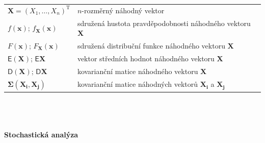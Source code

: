 \documentclass[a4paper,12pt]{report}
\theoremstyle{definition} \newtheorem{definice}[veta]{Definice}
\theoremstyle{remark}
\begin{document}
   \begin{tabular}{p{4cm} p{9.3cm}}
  $\boldsymbol{X}=(X_1,\dots,X_n)^\mathrm{T}$                 &     $n$-rozměrný náhodný vektor \\
  $f(\mathbf{x})$; $f_{\boldsymbol{X}}(\mathbf{x})$                                             &   sdružená hustota pravděpodobnosti náhodného vektoru  $\boldsymbol{X}$\\
   $F(\mathbf{x})$; $F_{\boldsymbol{X}}(\mathbf{x})$                                             &   sdružená distribuční funkce náhodného vektoru  $\boldsymbol{X}$\\
    $\mathsf{E}(\boldsymbol{X})$; $\mathsf{E}\boldsymbol{X}$                             &   vektor středních hodnot náhodného vektoru $\boldsymbol{X}$\\
   $\mathsf{D}(\boldsymbol{X})$; $\mathsf{D}\boldsymbol{X}$                             &   kovarianční matice náhodného vektoru $\boldsymbol{X}$\\
    $\boldsymbol{\Sigma}(\boldsymbol{X_i},\boldsymbol{X_j})$     &   kovarianční matice náhodných vektorů $\boldsymbol{X_i}$ a $\boldsymbol{X_j}$\\
   \end{tabular}\\\\\\
%
%
%
\textbf{Stochastická analýza}\\\\
\end{document}
